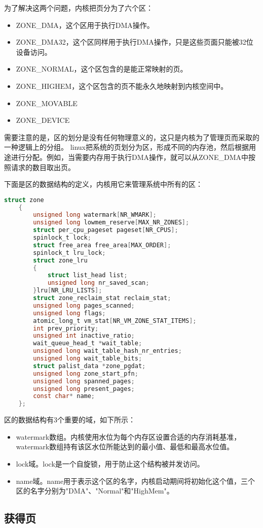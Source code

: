 \documentclass[a4paper,left=2.5cm,right=2.5cm,11pt]{article}
\begin{document}
	为了解决这两个问题，内核把页分为了六个区：
	\begin{itemize}
		\item ZONE\_DMA，这个区用于执行DMA操作。
		\item ZONE\_DMA32，这个区同样用于执行DMA操作，只是这些页面只能被32位设备访问。
		\item ZONE\_NORMAL，这个区包含的是能正常映射的页。
		\item ZONE\_HIGHEM，这个区包含的页不能永久地映射到内核空间中。
		\item ZONE\_MOVABLE
		\item ZONE\_DEVICE
	\end{itemize}

	需要注意的是，区的划分是没有任何物理意义的，这只是内核为了管理页而采取的一种逻辑上的分组。
	linux把系统的页划分为区，形成不同的内存池，然后根据用途进行分配。例如，当需要内存用于执行DMA操作，就可以从ZONE\_DMA中按照请求的数目取出页。\par

	下面是区的数据结构的定义，内核用它来管理系统中所有的区：
	\begin{lstlisting}[language = C]
	struct zone
	{
		unsigned long watermark[NR_WMARK];
		unsigned long lowmem_reserve[MAX_NR_ZONES];
		struct per_cpu_pageset pageset[NR_CPUS];
		spinlock_t lock;
		struct free_area free_area[MAX_ORDER];
		spinlock_t lru_lock;
		struct zone_lru
		{
			struct list_head list;
			unsigned long nr_saved_scan;
		}lru[NR_LRU_LISTS];
		struct zone_reclaim_stat reclaim_stat;
		unsigned long pages_scanned;
		unsigned long flags;
		atomic_long_t vm_stat[NR_VM_ZONE_STAT_ITEMS];
		int prev_priority;
		unsigned int inactive_ratio;
		wait_queue_head_t *wait_table;
		unsigned long wait_table_hash_nr_entries;
		unsigned long wait_table_bits;
		struct palist_data *zone_pgdat;
		unsigned long zone_start_pfn;
		unsigned long spanned_pages;
		unsigned long present_pages;
		const char* name;
	};
	\end{lstlisting}

	区的数据结构有3个重要的域，如下所示：
	\begin{itemize}
		\item watermark数组。内核使用水位为每个内存区设置合适的内存消耗基准，watermark数组持有该区水位所能达到的最小值、最低和最高水位值。
		\item lock域。lock是一个自旋锁，用于防止这个结构被并发访问。
		\item name域。name用于表示这个区的名字，内核启动期间将初始化这个值，三个区的名字分别为"DMA"、"Normal"和"HighMem"。
	\end{itemize}

\subsection{获得页}
\end{document}

